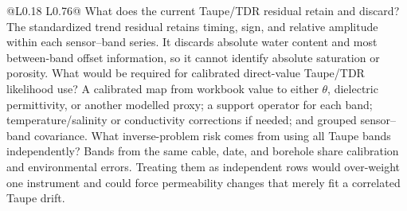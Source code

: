 \begin{longtable}{@{}L{0.18\textwidth} L{0.76\textwidth}@{}}
{ What does the current Taupe/TDR residual retain and discard?}
{The standardized trend residual retains timing, sign, and relative amplitude within
each sensor--band series.  It discards absolute water content and most between-band
offset information, so it cannot identify absolute saturation or porosity.}
{ What would be required for calibrated direct-value Taupe/TDR likelihood use?}
{A calibrated map from workbook value to either \(\theta\), dielectric permittivity,
or another modelled proxy; a support operator for each band; temperature/salinity or
conductivity corrections if needed; and grouped sensor--band covariance.}
{ What inverse-problem risk comes from using all Taupe bands independently?}
{Bands from the same cable, date, and borehole share calibration and environmental
errors.  Treating them as independent rows would over-weight one instrument and could
force permeability changes that merely fit a correlated Taupe drift.}
\bottomrule
\end{longtable}

